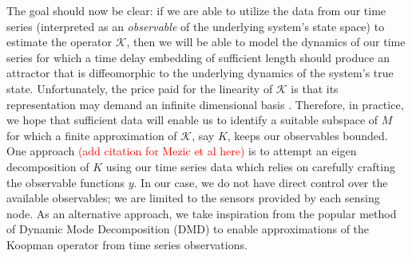 The goal should now be clear: if we are able to utilize the data from our time series (interpreted as an \textit{observable} of the underlying system's state space) to estimate the operator $\mathcal{K}$, then we will be able to model the dynamics of our time series for which a time delay embedding of sufficient length should produce an attractor that is diffeomorphic to the underlying dynamics of the system's true state. Unfortunately, the price paid for the linearity of $\mathcal{K}$ is that its representation may demand an infinite dimensional basis \cite{brunton-modern-koopman}. Therefore, in practice, we hope that sufficient data will enable us to identify a suitable subspace of $M$ for which a finite approximation of $\mathcal{K}$, say $K$, keeps our observables bounded. One approach \textcolor{red}{(add citation for Mezic et al here)} is to attempt an eigen decomposition of $K$ using our time series data which relies on carefully crafting the observable functions $y$. In our case, we do not have direct control over the available observables; we are limited to the sensors provided by each sensing node. As an alternative approach, we take inspiration from the popular method of Dynamic Mode Decomposition (DMD) to enable approximations of the Koopman operator from time series observations.

